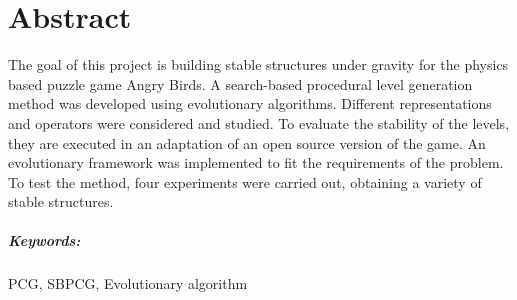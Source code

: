 \begingroup
\let\clearpage\relax
\let\cleardoublepage\relax
\let\cleardoublepage\relax

\chapter*{Abstract}
The goal of this project is building stable structures under gravity for the physics based puzzle game Angry Birds. A search-based procedural level generation method was developed using evolutionary algorithms. Different representations and operators were considered and studied. To evaluate the stability of the levels, they are executed in an adaptation of an open source version of the game. An evolutionary framework was implemented to fit the requirements of the problem. To test the method, four experiments were carried out, obtaining a variety of stable structures.


\paragraph{Keywords:} PCG, SBPCG, Evolutionary algorithm

\endgroup

\vfill
